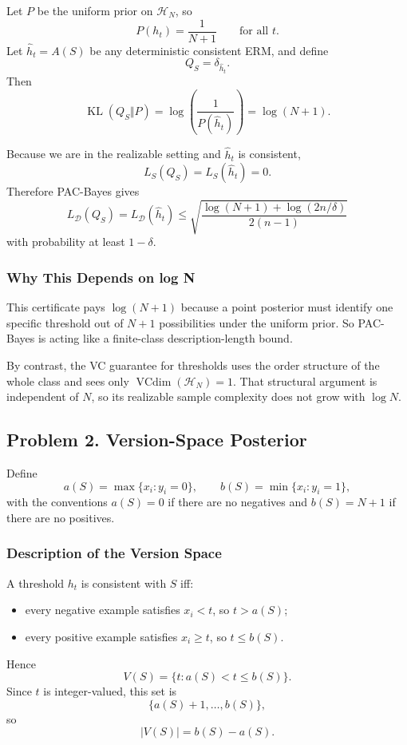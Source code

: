 \documentclass{article}
\DeclareMathOperator{\VC}{VCdim}
\DeclareMathOperator{\KL}{KL}
\newcommand{\cH}{\mathcal{H}}
\newcommand{\cD}{\mathcal{D}}
\begin{document}
Let $P$ be the uniform prior on $\cH_N$, so
$$
P(h_t)=\frac{1}{N+1}
\qquad
\text{for all } t.
$$
Let $\widehat{h}_t=A(S)$ be any deterministic consistent ERM, and define
$$
Q_S=\delta_{\widehat{h}_t}.
$$
Then
$$
\KL(Q_S\Vert P)
=
\log\!\left(\frac{1}{P(\widehat{h}_t)}\right)
=
\log(N+1).
$$

Because we are in the realizable setting and $\widehat{h}_t$ is consistent,
$$
L_S(Q_S)=L_S(\widehat{h}_t)=0.
$$
Therefore PAC-Bayes gives
$$
L_{\cD}(Q_S)
=
L_{\cD}(\widehat{h}_t)
\le
\sqrt{
\frac{
\log(N+1)+\log(2n/\delta)
}{
2(n-1)
}
}
$$
with probability at least $1-\delta$.

\subsubsection{Why This Depends on log N}

This certificate pays $\log(N+1)$ because a point posterior must identify one specific threshold out of $N+1$ possibilities under the uniform prior. So PAC-Bayes is acting like a finite-class description-length bound.

By contrast, the VC guarantee for thresholds uses the order structure of the whole class and sees only $\VC(\cH_N)=1$. That structural argument is independent of $N$, so its realizable sample complexity does not grow with $\log N$.

\subsection{Problem 2. Version-Space Posterior}

Define
$$
a(S)=\max\{x_i:y_i=0\},
\qquad
b(S)=\min\{x_i:y_i=1\},
$$
with the conventions $a(S)=0$ if there are no negatives and $b(S)=N+1$ if there are no positives.

\subsubsection{Description of the Version Space}

A threshold $h_t$ is consistent with $S$ iff:
\begin{itemize}
\item every negative example satisfies $x_i<t$, so $t>a(S)$;
\item every positive example satisfies $x_i\ge t$, so $t\le b(S)$.
\end{itemize}
Hence
$$
V(S)=\{t:a(S)<t\le b(S)\}.
$$
Since $t$ is integer-valued, this set is
$$
\{a(S)+1,\dots,b(S)\},
$$
so
$$
|V(S)|=b(S)-a(S).
$$
\end{document}
